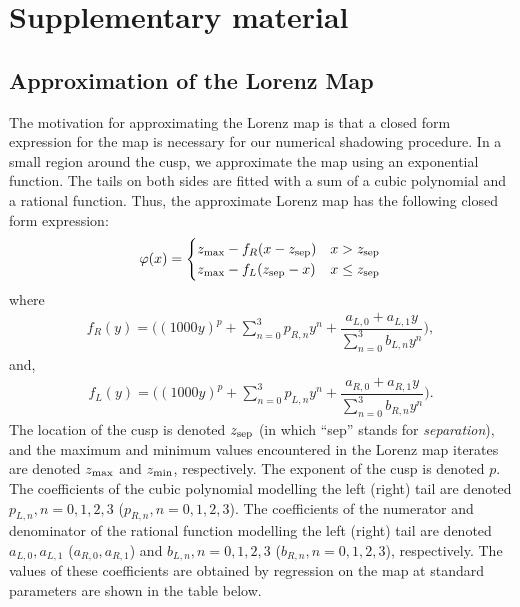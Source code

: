 \section{Supplementary material}
\subsection{Approximation of the Lorenz Map}
\label{sec:lorenzMapApprox}
The motivation for approximating the Lorenz map is that a 
closed form expression for the map is necessary for our numerical shadowing procedure. In a small region around the cusp, we approximate the map using an exponential function. The tails on both sides are fitted with a sum of a cubic polynomial and a rational function. Thus, the approximate Lorenz map has the 
following closed form expression:
\begin{align}
    \varphi(x) = \begin{cases}
        z_{\rm max} - f_R(x - z_{\rm sep})   &  x > z_{\rm sep} \\
        z_{\rm max} -  f_L(z_{\rm sep} - x)   &  x \leq z_{\rm sep}
    \end{cases}
\end{align}
where 
\begin{align}
    f_R(y) = \Big( (1000 y)^p + 
        \sum_{n=0}^3 p_{R,n} y^n + \dfrac{a_{L,0} + a_{L,1} y}{\sum_{n=0}^3 b_{L,n} y^n}\Big),
\end{align}
and,
\begin{align}
    f_L(y) = \Big((1000 y)^p 
        + \sum_{n=0}^3 p_{L,n} y^n + \dfrac{a_{R,0} + a_{R,1}y}{\sum_{n=0}^3 b_{R,n} y^n}\Big).
\end{align}
The location of the cusp is denoted $z_{\rm sep}$ (in which ``sep'' stands 
for \emph{separation}), and the maximum and minimum values encountered 
in the Lorenz map iterates are denoted $z_{\rm max}$ and $z_{\rm min}$, respectively. The exponent of the cusp is denoted $p$. The coefficients of the cubic polynomial modelling the left (right) tail are  denoted $p_{L,n}, n = 0,1,2,3$ ($p_{R,n}, n = 0,1,2,3$). The coefficients of the numerator and denominator of the rational function modelling the left (right) tail are denoted $a_{L,0}, a_{L,1}$ ($a_{R,0}, a_{R,1}$) and $b_{L,n}, n=0,1,2,3$ ($b_{R,n}, n=0,1,2,3$), respectively. The values of these coefficients are obtained by 
regression on the map at standard parameters are shown in the table below.
